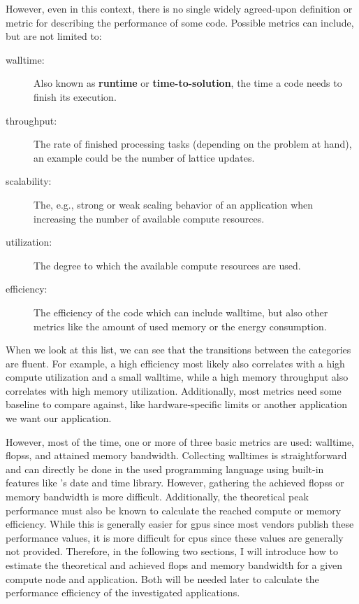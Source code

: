 However, even in this context, there is no single widely agreed-upon definition or metric for describing the performance of some code. 
Possible metrics can include, but are not limited to:
\begin{description}
    \item[walltime:] Also known as \textbf{runtime} or \textbf{time-to-solution}, the time a code needs to finish its execution.
    \item[throughput:] The rate of finished processing tasks (depending on the problem at hand), an example could be the number of lattice updates.
    \item[scalability:] The, e.g., strong or weak scaling behavior of an application when increasing the number of available compute resources.
    \item[utilization:] The degree to which the available compute resources are used. 
    \item[efficiency:] The efficiency of the code which can include walltime, but also other metrics like the amount of used memory or the energy consumption. 
\end{description}
When we look at this list, we can see that the transitions between the categories are fluent. 
For example, a high efficiency most likely also correlates with a high compute utilization and a small walltime, while a high memory throughput also correlates with high memory utilization. 
Additionally, most metrics need some baseline to compare against, like hardware-specific limits or another application we want our application. 

However, most of the time, one or more of three basic metrics are used: walltime, \glspl{flops}, and attained memory bandwidth. 
Collecting walltimes is straightforward and can directly be done in the used programming language using built-in features like \cpp's date and time  library. 
However, gathering the achieved \glspl{flops} or memory bandwidth is more difficult. 
Additionally, the theoretical peak performance must also be known to calculate the reached compute or memory efficiency. 
While this is generally easier for \glspl{gpu} since most vendors publish these performance values, it is more difficult for \glspl{cpu} since these values are generally not provided. 
Therefore, in the following two sections, I will introduce how to estimate the theoretical and achieved \gls{flops} and memory bandwidth for a given compute node and application. 
Both will be needed later to calculate the performance efficiency of the investigated applications. 


